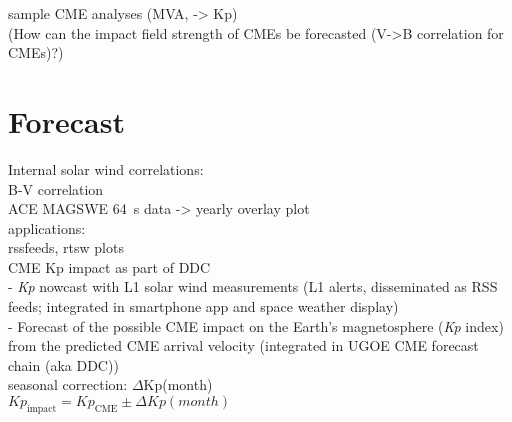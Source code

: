 sample CME analyses (MVA, -> Kp)\\

(How can the impact field strength of CMEs be forecasted (V->B correlation for CMEs)?)\\


\section{Forecast}
Internal solar wind correlations:\\
B-V correlation\\
ACE MAGSWE 64~s data -> yearly overlay plot\\

applications:\\
rssfeeds, rtsw plots\\
CME Kp impact as part of DDC\\
- \textit{Kp} nowcast with L1 solar wind measurements (L1 alerts, disseminated as RSS feeds; integrated in smartphone app and space weather display)\\
- Forecast of the possible CME impact on the Earth's magnetosphere (\textit{Kp} index) from the predicted CME arrival velocity (integrated in UGOE CME forecast chain (aka DDC))\\


seasonal correction: $\Delta$Kp(month)\\
$Kp_\text{impact} = Kp_\text{CME} \pm \Delta Kp(month)$\\

